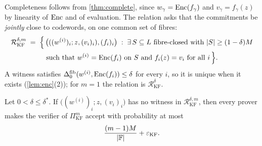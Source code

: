 Completeness follows from \cref{thm:complete}, since $w_\gamma = \mathrm{Enc}(f_\gamma)$ and $v_\gamma = f_\gamma(z)$ by linearity of $\mathrm{Enc}$ and of evaluation.
The relation asks that the commitments be \emph{jointly} close to codewords, on one common set of fibres:
\begin{multline*}
  \mathcal{R}^{\delta,m}_{\mathrm{KF}} \;=\; \Bigl\{\, \bigl(((w^{(i)})_i; z, (v_i)_i), (f_i)_i\bigr) \;:\; \exists\, S \subseteq L \text{ fibre-closed with } |S| \ge (1-\delta)M \\
  \text{such that } w^{(i)} = \mathrm{Enc}(f_i) \text{ on } S \text{ and } f_i(z) = v_i \text{ for all } i \,\Bigr\}.
\end{multline*}
A witness satisfies $\Delta^{\mathrm{fib}}_0(w^{(i)}, \mathrm{Enc}(f_i)) \le \delta$ for every $i$, so it is unique when it exists (\cref{lem:enc}(2)); for $m = 1$ the relation is $\mathcal{R}^\delta_{\mathrm{KF}}$.

\begin{theorem}\label{thm:batch}
Let $0 < \delta \le \delta^*$. If $\bigl((w^{(i)})_i; z, (v_i)_i\bigr)$ has no witness in $\mathcal{R}^{\delta,m}_{\mathrm{KF}}$, then every prover makes the verifier of $\Pi^m_{\mathrm{KF}}$ accept with probability at most
\[
  \frac{(m-1)M}{|\mathbb{F}|} + \varepsilon_{\mathrm{KF}}.
\]
\end{theorem}

